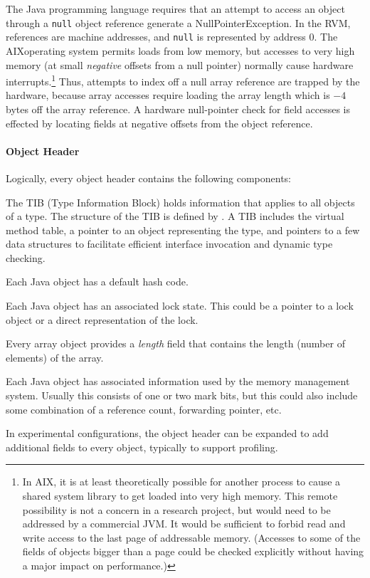 The Java programming language requires that an attempt to access an
object through a {\tt null} 
object reference generate a NullPointerException.  In the RVM, references
are machine addresses, and {\tt null} is represented by address $0$.
The AIX\AIXTMFootnote operating system permits loads from low memory,
but accesses 
to very high memory (at small {\em negative} offsets from a null
pointer) normally cause hardware interrupts.\footnote{In AIX, it is at
least theoretically possible for another process to cause a shared
system library to get loaded into very high memory.  This remote
possibility is not a concern in a research project, but would need to
be addressed by a commercial JVM.  It would be sufficient to forbid
read and write access to the last page of addressable memory.
(Accesses to some of the fields of objects bigger than a page could be
checked explicitly without having a major impact on performance.)}
Thus, attempts to index off a null array reference are trapped by
the hardware, because array accesses require loading the array length
which is $-4$ bytes off the array reference.  A hardware null-pointer
check for field accesses is effected by locating fields at negative
offsets from the object reference.

\paragraph{Object Header}
Logically, every object header contains the following components:
\begin{description}
%
\item [TIB Pointer] The TIB (Type Information Block) holds information that
applies to all objects of a type.  The structure of the TIB is defined by 
.
A TIB includes the virtual method table, a pointer to an object
representing the type, and pointers to a few data structures to
facilitate efficient interface invocation and dynamic type checking.
%
\item[Default Hash Code] Each Java object has a default hash code.
%
\item[Lock] Each Java object has an associated lock state.  This could be a
pointer to a lock object or a direct representation of the lock.
%
\item[Array Length] Every array object provides a {\em length} field
that contains the length (number of elements) of the array.
%
\item[Garbage Collection Information] Each Java object has associated
information used by the memory management system.  Usually this consists of one
or two mark bits, but this could also include some combination of a reference
count, forwarding pointer, etc.
%
\item[Misc Fields] In experimental configurations, the object header
can be expanded to add additional fields to every object, typically to
support profiling. 
\end{description}

